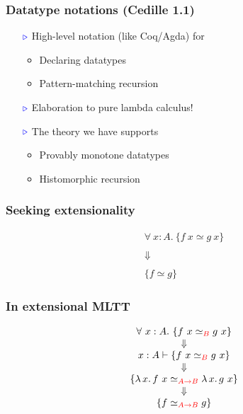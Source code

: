 \documentclass[11pt]{beamer}
\newcommand{\myb}[0]{\ensuremath{\textcolor{blue}{\triangleright}}}
\begin{document}
\begin{frame}
  \frametitle{Datatype notations (Cedille 1.1)}

  \begin{itemize}
  \item[$\myb$] High-level notation (like Coq/Agda) for
    \begin{itemize}
    \item Declaring datatypes
    \item Pattern-matching recursion
    \end{itemize}
\vspace{.18cm}
  \item[$\myb$] Elaboration to pure lambda calculus!
\vspace{.2cm}
  \item[$\myb$] The theory we have supports
    \begin{itemize}
    \item Provably monotone datatypes
    \item Histomorphic recursion
    \end{itemize}
  \end{itemize}
\end{frame}

\begin{frame}
  \frametitle{Seeking extensionality}

\Large

  \[
  \begin{array}{c}
    \forall\ x : A.\ \{ f\ x \simeq g\ x \}
    \\    \\
    \Downarrow
    \\    \\
    \{ f \simeq g \}
  \end{array}
  \]

  \end{frame}

\newcommand{\csimeq}[1]{\simeq_{\color{red}#1}}

\begin{frame}
  \frametitle{In extensional MLTT}

\Large

  \[
  \begin{array}{c}
    \forall\ x : A.\ \{ f\ x \csimeq{B} g\ x\}
    \\    
    \Downarrow
    \\    
    x : A \vdash \{ f\ x \csimeq{B} g\ x \}
    \\
    \Downarrow
    \\    
    \{ \lambda\, x.\, f\ x \csimeq{A\to B} \lambda\, x.\, g\ x \}
    \\
    \Downarrow
    \\    
    \{ f \csimeq{A\to B} g \}
  \end{array}
  \]

  \vspace{1cm}

\pause
  \begin{center}
\color{purple}
\Large
    \end{center}

  \end{frame}
\end{document}
